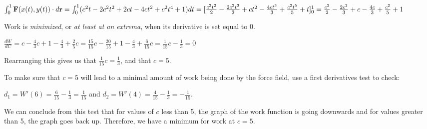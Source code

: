\documentclass{article}
\begin{document}
\par\noindent $\int_{0}^{1}\textbf{F}(x(t), y(t))\cdot d\textbf{r} = \int_{0}^{1}(c^{2}t - 2c^{2}t^{2} + 2ct - 4ct^{2} + c^{2}t^{4} + 1)dt = [\frac{c^{2}t^{2}}{2} - \frac{2c^{2}t^{3}}{3} + ct^{2} - \frac{4ct^{3}}{3} + \frac{c^{2}t^{5}}{5} + t]_{0}^{1}\linebreak = \frac{c^{2}}{2} - \frac{2c^{2}}{3} + c - \frac{4c}{3} + \frac{c^{2}}{5} + 1$\vspace{0.25cm}

\par\noindent Work is \textit{minimized}, or \textit{at least at an extrema}, when its derivative is set equal to 0.
\par\noindent $\frac{dW}{dC} = c - \frac{4}{3}c + 1 - \frac{4}{3} + \frac{2}{5}c = \frac{15}{15}c - \frac{20}{15} + 1 - \frac{4}{3} + \frac{6}{15}c = \frac{1}{15}c - \frac{1}{3} = 0$
\par\noindent Rearranging this gives us that $\frac{1}{15}c = \frac{1}{3}$, and that $c = 5$.\vspace{0.25cm}

\par\noindent\Large To make sure that $c = 5$ will lead to a minimal amount of work being done by the force field, use a first derivatives test to check:
\par\noindent\Large $d_{1} = W'(6) = \frac{6}{15} - \frac{1}{3} = \frac{1}{15}$ and $d_{2} = W'(4) = \frac{4}{15} - \frac{1}{3} = -\frac{1}{15}$.\vspace{0.25cm}

\par\noindent\Large We can conclude from this test that for values of $c$ less than 5, the graph of the work function is going downwards and for values greater than 5, the graph goes back up.  Therefore, we have a minimum for work at $c = 5$.


\end{document}

